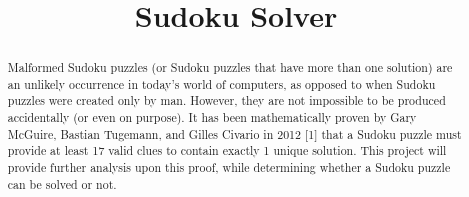 \documentclass[conference]{IEEEtran}
\title{Sudoku Solver}
\begin{document}
\author{
\and
{}
\and
{}
\and
{}
\and
{}
}
\maketitle

\vspace{2\baselineskip}


\vspace{1\baselineskip}

\begin{abstract}
Malformed Sudoku puzzles (or Sudoku puzzles that have more than one solution) are an unlikely occurrence in today's world of computers, as opposed to when Sudoku puzzles were created only by man. However, they are not impossible to be produced accidentally (or even on purpose). It has been mathematically proven by Gary McGuire, Bastian Tugemann, and Gilles Civario in 2012 [1] that a Sudoku puzzle must provide at least 17 valid clues to contain exactly 1 unique solution. This project will provide further analysis upon this proof, while determining whether a Sudoku puzzle can be solved or not.
\end{abstract}
\end{document}
